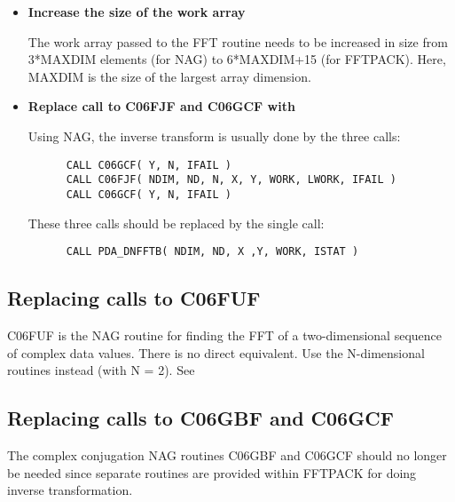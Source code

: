 \begin{itemize}

\item{\bf Increase the size of the work array}

   The work array passed to the FFT routine needs to be increased in
   size from 3*MAXDIM elements (for NAG) to 6*MAXDIM+15 (for FFTPACK).
   Here, MAXDIM is the size of the largest array dimension.

\item{\bf Replace call to C06FJF and C06GCF with
}

   Using NAG, the inverse transform is usually done by the three calls:

\begin{verbatim}
      CALL C06GCF( Y, N, IFAIL )
      CALL C06FJF( NDIM, ND, N, X, Y, WORK, LWORK, IFAIL )
      CALL C06GCF( Y, N, IFAIL )
\end{verbatim}

   These three calls should be replaced by the single call:

\begin{verbatim}
      CALL PDA_DNFFTB( NDIM, ND, X ,Y, WORK, ISTAT )
\end{verbatim}

\end{itemize}


\subsection{Replacing calls to C06FUF}

   C06FUF is the NAG routine for finding the FFT of a two-dimensional
   sequence of complex data values. There is no direct equivalent. Use
   the N-dimensional routines instead (with N = 2). See


\subsection{Replacing calls to C06GBF and C06GCF}

   The complex conjugation NAG routines C06GBF and C06GCF should no
   longer be needed since separate routines are provided within FFTPACK
   for doing inverse transformation.

